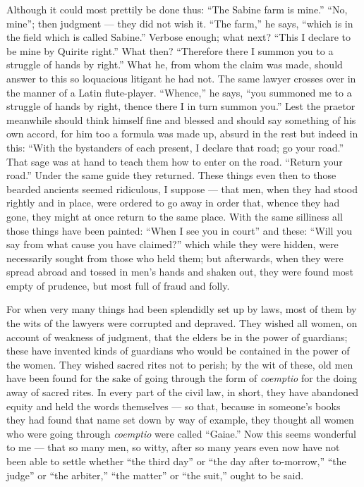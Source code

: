  Although it could most prettily be done thus: ``The Sabine farm is mine.'' ``No, mine''; then judgment --- they did not wish it. ``The farm,'' he says, ``which is in the field which is called Sabine.'' Verbose enough; what next? ``This I declare to be mine by Quirite right.'' What then? ``Therefore there I summon you to a struggle of hands by right.'' What he, from whom the claim was made, should answer to this so loquacious litigant he had not. The same lawyer crosses over in the manner of a Latin flute-player. ``Whence,'' he says, ``you summoned me to a struggle of hands by right, thence there I in turn summon you.'' Lest the praetor meanwhile should think himself fine and blessed and should say something of his own accord, for him too a formula was made up, absurd in the rest but indeed in this: ``With the bystanders of each present, I declare that road; go your road.'' That sage was at hand to teach them how to enter on the road. ``Return your road.'' Under the same guide they returned. These things even then to those bearded ancients seemed ridiculous, I suppose --- that men, when they had stood rightly and in place, were ordered to go away in order that, whence they had gone, they might at once return to the same place. With the same silliness all those things have been painted: ``When I see you in court'' and these: ``Will you say from what cause you have claimed?'' which while they were hidden, were necessarily sought from those who held them; but afterwards, when they were spread abroad and tossed in men's hands and shaken out, they were found most empty of prudence, but most full of fraud and folly.

 For when very many things had been splendidly set up by laws, most of them by the wits of the lawyers were corrupted and depraved. They wished all women, on account of weakness of judgment, that the elders be in the power of guardians; these have invented kinds of guardians who would be contained in the power of the women. They wished sacred rites not to perish; by the wit of these, old men have been found for the sake of going through the form of \textit{coemptio} for the doing away of sacred rites. In every part of the civil law, in short, they have abandoned equity and held the words themselves --- so that, because in someone's books they had found that name set down by way of example, they thought all women who were going through \textit{coemptio} were called ``Gaiae.'' Now this seems wonderful to me --- that so many men, so witty, after so many years even now have not been able to settle whether ``the third day'' or ``the day after to-morrow,'' ``the judge'' or ``the arbiter,'' ``the matter'' or ``the suit,'' ought to be said.

